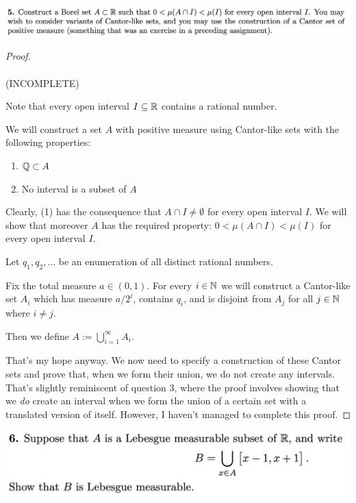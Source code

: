 \newpage
\begin{mdframed}
\includegraphics[width=400pt]{img/analysis--berkeley-202a-hw05-40cd.png}
\end{mdframed}

\begin{proof}~\\~\\
  (INCOMPLETE)

  Note that every open interval $I \subseteq \mathbb{R}$ contains a rational number.

  We will construct a set $A$ with positive measure using Cantor-like sets with the following properties:
  \begin{enumerate}
  \item $\mathbb{Q} \subset A$
  \item No interval is a subset of $A$
  \end{enumerate}
  Clearly, (1) has the consequence that $A \cap I \neq \emptyset$ for every open interval $I$. We will show
  that moreover $A$ has the required property: $0 < \mu(A \cap I) < \mu(I)$ for every open interval $I$.

  Let $q_1, q_2, \ldots$ be an enumeration of all distinct rational numbers.

  Fix the total measure $a \in (0, 1)$. For every $i \in \mathbb{N}$ we will construct a Cantor-like set $A_i$ which
  has measure $a/2^i$, contains $q_i$, and is disjoint from $A_j$ for all $j \in \mathbb{N}$ where $i \neq j$.

  Then we define $A := \bigcup_{i=1}^\infty A_i$.

  That's my hope anyway. We now need to specify a construction of these Cantor sets and prove that, when we
  form their union, we do not create any intervals. That's slightly reminiscent of question 3, where the proof
  involves showing that we {\it do} create an interval when we form the union of a certain set with a translated
  version of itself. However, I haven't managed to complete this proof.
\end{proof}


\newpage
\begin{mdframed}
\includegraphics[width=400pt]{img/analysis--berkeley-202a-hw05-3d2c.png}
\end{mdframed}

